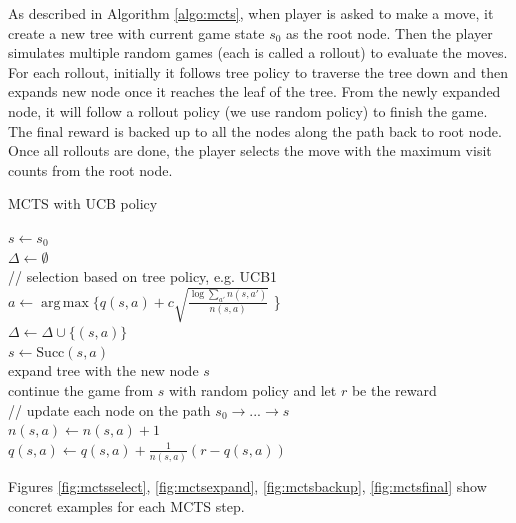 \documentclass{article}
\DeclareMathOperator*{\argmax}{arg\,max}
\begin{document}
As described in Algorithm \ref{algo:mcts}, when player is asked to make a move, it create a new tree with current game state $s_0$ as the root node. Then the player simulates multiple random games (each is called a rollout) to evaluate the moves. For each rollout, initially it follows tree policy to traverse the tree down and then expands new node once it reaches the leaf of the tree. From the newly expanded node, it will follow a rollout policy (we use random policy) to finish the game. The final reward is backed up to all the nodes along the path back to root node. Once all rollouts are done, the player selects the move with the maximum visit counts from the root node. 

\begin{algorithm} 
  \DontPrintSemicolon
  \caption{MCTS with UCB policy}
  \label{algo:mcts}
   {
    $ s \gets s_0 $ \\
    $ \Delta \gets \emptyset$ \\
    // selection based on tree policy, e.g. UCB1 \cite{auer2002finite} \\
     {
      $a  \gets \argmax \{ q(s, a) + c \sqrt{\frac{\log \sum_{a'}n(s, a')}{n(s,a)}}$ \}\\
      $\Delta \gets \Delta \cup \{(s, a)\}  $ \\
      $s \gets \text{Succ}(s, a) $\\
    }
    expand tree with the new node $s$ \\
    continue the game from $s$ with random policy and let $r$ be the reward \\
    // update each node on the path $s_0 \rightarrow ... \rightarrow s$ \\
     {
      $ n(s, a) \gets n(s,a) + 1 $ \\
      $ q(s, a) \gets q(s,a) +  \frac{1}{n(s,a)} (r - q(s,a))$ \\
    }
  }
  \Return{$\argmax_{a} q(s_0, a) $}
\end{algorithm}

Figures \ref{fig:mctsselect}, \ref{fig:mctsexpand}, \ref{fig:mctsbackup}, \ref{fig:mctsfinal} show concret examples for each MCTS step.
\end{document}

